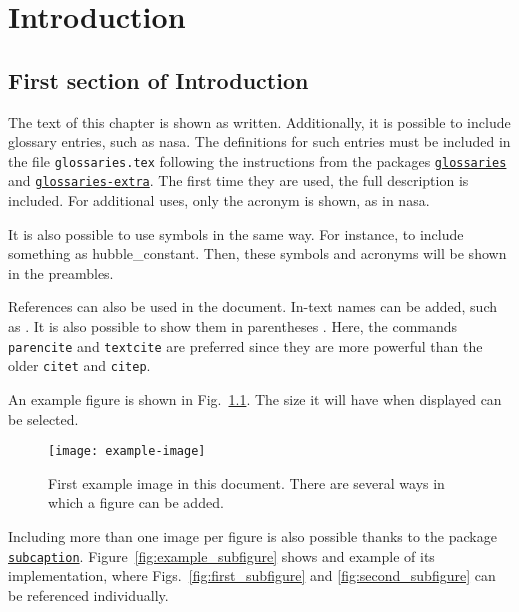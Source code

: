 \pagestyle{MyThesisStyle}
\chapter[\MakeUppercase{Introduction}]{Introduction}\label{chap:chapter_01}

\section[\MakeUppercase{First section of Introduction}]{First section of Introduction}\label{sec:first_section}

The text of this chapter is shown as written. Additionally, it is possible to include glossary entries, such as \gls{nasa}. The definitions for such entries must be included in the file \texttt{glossaries.tex} following the instructions from the packages \href{https://www.ctan.org/pkg/glossaries}{\texttt{glossaries}} and \href{https://ctan.org/pkg/glossaries-extra}{\texttt{glossaries-extra}}. The first time they are used, the full description is included. For additional uses, only the acronym is shown, as in \gls{nasa}.

It is also possible to use symbols in the same way. For instance, to include something as \gls{hubble_constant}. Then, these symbols and acronyms will be shown in the preambles.

References can also be used in the document. In-text names can be added, such as \textcite{MartinThrones}. It is also possible to show them in parentheses \parencite[such as:][]{whitman1855leaves}. Here, the commands \texttt{parencite} and \texttt{textcite} are preferred since they are more powerful than the older \texttt{citet} and \texttt{citep}.

An example figure is shown in Fig.~\ref{fig:example_figure_01}. The size it will have when displayed can be selected.

\begin{figure}[htbp]
    \centering
    \texttt{[image: example-image]}
    \caption[First example image]{First example image in this document. There are several ways in which a figure can be added.}
    \label{fig:example_figure_01}
\end{figure}

Including more than one image per figure is also possible thanks to the package \href{https://ctan.org/pkg/subcaption}{\texttt{subcaption}}. Figure~\ref{fig:example_subfigure} shows and example of its implementation, where Figs.~\ref{fig:first_subfigure} and \ref{fig:second_subfigure} can be referenced individually.

